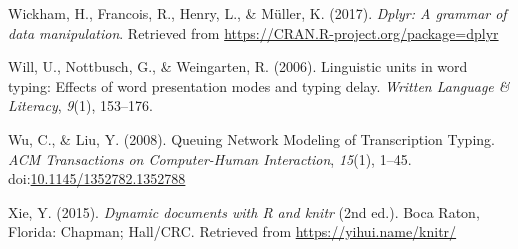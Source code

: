 \documentclass[floatsintext,man]{apa6}
\theoremstyle{definition}
\theoremstyle{definition}
\theoremstyle{definition}
\theoremstyle{remark}
\begin{document}
\hypertarget{ref-R-dplyr}{}
Wickham, H., Francois, R., Henry, L., \& Müller, K. (2017). \emph{Dplyr:
A grammar of data manipulation}. Retrieved from
\url{https://CRAN.R-project.org/package=dplyr}

\hypertarget{ref-will_linguistic_2006}{}
Will, U., Nottbusch, G., \& Weingarten, R. (2006). Linguistic units in
word typing: Effects of word presentation modes and typing delay.
\emph{Written Language \& Literacy}, \emph{9}(1), 153--176.

\hypertarget{ref-wu_queuing_2008}{}
Wu, C., \& Liu, Y. (2008). Queuing Network Modeling of Transcription
Typing. \emph{ACM Transactions on Computer-Human Interaction},
\emph{15}(1), 1--45.
doi:\href{https://doi.org/10.1145/1352782.1352788}{10.1145/1352782.1352788}

\hypertarget{ref-R-knitr}{}
Xie, Y. (2015). \emph{Dynamic documents with R and knitr} (2nd ed.).
Boca Raton, Florida: Chapman; Hall/CRC. Retrieved from
\url{https://yihui.name/knitr/}

\endgroup
\end{document}
